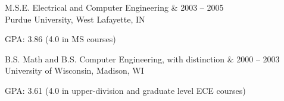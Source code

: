\documentclass[letterpaper]{scrartcl}
\begin{document}
\begin{list1}
\item
  \begin{tabular1bold}M.S.E. Electrical and Computer Engineering & 2003 -- 2005 \\
    Purdue University, West Lafayette, IN
  \end{tabular1bold}

  \begin{list2}
  \item GPA: 3.86 (4.0 in MS courses)
  \end{list2}
\item
  \begin{tabular1bold}B.S. Math and B.S. Computer Engineering, with distinction & 2000 -- 2003 \\
    University of Wisconsin, Madison, WI
  \end{tabular1bold}

  \begin{list2}
  \item GPA: 3.61 (4.0 in upper-division and graduate level ECE courses)
  \end{list2}

\end{list1}
\end{document}
